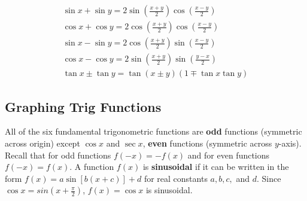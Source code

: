         \begin{align*}
            \sin x + \sin y = 2\sin(\frac{x+y}{2})\cos(\frac{x-y}{2}) \\
            \cos x + \cos y = 2\cos(\frac{x+y}{2})\cos(\frac{x-y}{2}) \\
            \sin x - \sin y = 2 \cos (\frac{x+y}{2}) \sin(\frac{x-y}{2}) \\
            \cos x - \cos y = 2 \sin (\frac{x+y}{2}) \sin(\frac{y-x}{2}) \\
            \tan x \pm \tan y = \tan(x\pm y)(1\mp \tan x \tan y)
        \end{align*}



    \pagebreak
    \subsection{Graphing Trig Functions}
        All of the six fundamental trigonometric functions are \textbf{odd} functions
        (symmetric across origin) except $\cos x$ and $\sec x$, \textbf{even} functions
        (symmetric across $y$-axis). Recall that for odd functions $f(-x)=-f(x)$ and for even
        functions $f(-x)=f(x)$. A function $f(x)$ is \textbf{sinusoidal} if it can be written in
        the form $f(x)=a\sin[b(x+c)]+d$ for real constants $a, b, c,$ and $d$. Since
        $\cos x = sin (x+\frac{\pi}{2})$, $f(x)=\cos x$ is sinusoidal. \\

